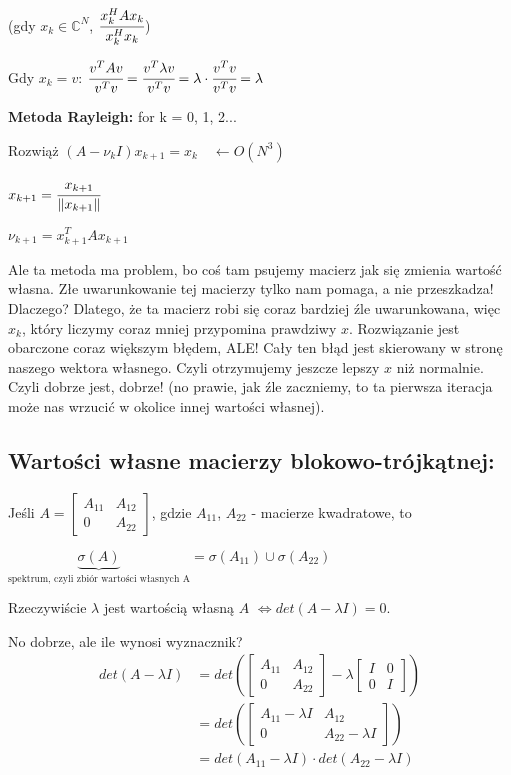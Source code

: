 \documentclass[hidelinks,a4paper,fleqn,oneside]{book}
\newcommand{\CC}{\mathbb{C}}
\newcommand{\la}{\leftarrow}
\newcommand{\norm}[1]{\left\lVert#1\right\rVert}
\begin{document}
(gdy $x_k \in \CC^N$, $\cfrac{x_k^H A x_k}{x_k^Hx_k}$)

Gdy $x_k = v$: $\cfrac{v^TAv}{v^Tv} = \cfrac{v^T \lambda v}{v^T v} = \lambda \cdot \cfrac{v^T v}{v^T v} = \lambda$


\textbf{Metoda Rayleigh:}
for k = 0, 1, 2...

Rozwiąż $(A - \nu_k I)x_{k+1} = x_k \quad \la O(N^3)$
 
$x_{k+1} = \cfrac{x_{k+1}}{\norm{x_{k+1}}}$

$\nu_{k+1} = x_{k+1}^T A x_{k+1}$
 
Ale ta metoda ma problem, bo coś tam psujemy macierz jak się zmienia wartość własna. Złe uwarunkowanie tej macierzy tylko nam pomaga, a nie przeszkadza! Dlaczego? Dlatego, że ta macierz robi się coraz bardziej źle uwarunkowana, więc $x_k$, który liczymy coraz mniej przypomina prawdziwy $x$. Rozwiązanie jest obarczone coraz większym błędem, ALE! Cały ten błąd jest skierowany w stronę naszego wektora własnego. Czyli otrzymujemy jeszcze lepszy $x$ niż normalnie. Czyli dobrze jest, dobrze! (no prawie, jak źle zaczniemy, to ta pierwsza iteracja może nas wrzucić w okolice innej wartości własnej). 


\subsection{Wartości własne macierzy blokowo-trójkątnej:}

Jeśli $A = \left[\begin{array}{c|c}A_{11} & A_{12} \\ \hline 0 & A_{22}\end{array}\right]$, gdzie $A_{11}$, $A_{22}$ - macierze kwadratowe, to

$\underbrace{\sigma(A)}_{\textrm{spektrum, czyli zbiór wartości własnych A}} = \sigma(A_{11}) \cup \sigma(A_{22})$

Rzeczywiście $\lambda$ jest wartością własną $A$ $\iff det(A -\lambda I) = 0$.

No dobrze, ale ile wynosi wyznacznik?
\begin{equation}
	\begin{aligned}
		det(A - \lambda I) & = det\left( \left[\begin{array}{c|c}A_{11} & A_{12} \\ \hline 0 & A_{22}\end{array}\right] - \lambda  \left[\begin{array}{c|c}I & 0 \\ \hline 0 & I\end{array}\right] \right) \\
		& = det\left( \left[\begin{array}{c|c}A_{11}-\lambda I & A_{12} \\ \hline 0 & A_{22} - \lambda I\end{array}\right]\right) \\
		& = det(A_{11} - \lambda I) \cdot det(A_{22} - \lambda I)
	\end{aligned}
\end{equation}
\end{document}
